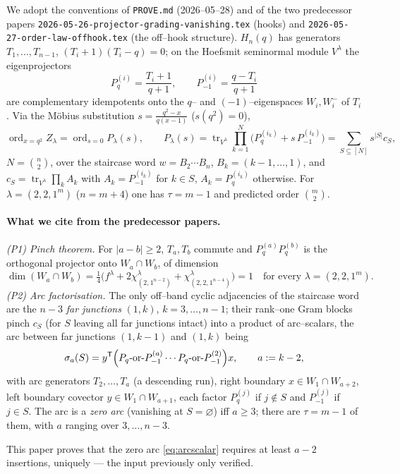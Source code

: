 \documentclass[11pt]{article}
\theoremstyle{definition}
\DeclareMathOperator{\tr}{tr}
\DeclareMathOperator{\ord}{ord}
\newcommand{\Pq}{P_{q}}
\newcommand{\Pm}{P_{-1}}
\newcommand{\la}{\lambda}
\newcommand{\W}{W}
\begin{document}
We adopt the conventions of \texttt{PROVE.md} (2026--05--28) and of the two predecessor
papers \texttt{2026-05-26-projector-grading-vanishing.tex} (hooks) and
\texttt{2026-05-27-order-law-offhook.tex} (the off--hook structure). $H_n(q)$ has
generators $T_1,\dots,T_{n-1}$, $(T_i+1)(T_i-q)=0$; on the Hoefsmit seminormal module
$V^\la$ the eigenprojectors
\[
\Pq^{(i)}=\frac{T_i+1}{q+1},\qquad \Pm^{(i)}=\frac{q-T_i}{q+1}
\]
are complementary idempotents onto the $q$-- and $(-1)$--eigenspaces $\W_i,\W_i^-$ of
$T_i$. Via the M\"obius substitution $s=\tfrac{q^2-x}{q(x-1)}$ ($s(q^2)=0$),
\[
\ord_{x=q^2}Z_\la=\ord_{s=0}P_\la(s),\qquad
P_\la(s)=\tr_{V^\la}\prod_{k=1}^N\bigl(\Pq^{(i_k)}+s\,\Pm^{(i_k)}\bigr)
=\sum_{S\subseteq[N]}s^{|S|}c_S,
\]
$N=\binom n2$, over the staircase word $w=B_2\cdots B_n$, $B_k=(k-1,\dots,1)$, and
$c_S=\tr_{V^\la}\prod_k A_k$ with $A_k=\Pm^{(i_k)}$ for $k\in S$, $A_k=\Pq^{(i_k)}$
otherwise. For $\la=(2,2,1^m)$ ($n=m+4$) one has $\tau=m-1$ and predicted order
$\binom m2$.

\paragraph{What we cite from the predecessor papers.}
\emph{(P1) Pinch theorem.} For $|a-b|\ge2$, $T_a,T_b$ commute and
$\Pq^{(a)}\Pq^{(b)}$ is the orthogonal projector onto $\W_a\cap\W_b$, of dimension
\[
\dim(\W_a\cap\W_b)=\tfrac14\bigl(f^\la+2\chi^\la_{(2,1^{n-2})}+\chi^\la_{(2,2,1^{n-4})}\bigr)=1
\quad\text{for every }\la=(2,2,1^m).
\]
\emph{(P2) Arc factorisation.} The only off--band cyclic adjacencies of the staircase word
are the $n-3$ \emph{far junctions} $(1,k)$, $k=3,\dots,n-1$; their rank--one Gram blocks
pinch $c_S$ (for $S$ leaving all far junctions intact) into a product of arc--scalars,
the arc between far junctions $(1,k{-}1)$ and $(1,k)$ being
\begin{equation}\label{eq:arcscalar}
\sigma_a(S)=y^{\mathsf T}\Bigl(\Pq\text{-or-}\Pm^{(a)}\cdots\Pq\text{-or-}\Pm^{(2)}\Bigr)x,
\qquad a:=k-2,
\end{equation}
with arc generators $T_2,\dots,T_a$ (a descending run), right boundary
$x\in\W_1\cap\W_{a+2}$, left boundary covector $y\in\W_1\cap\W_{a+1}$, each factor
$\Pq^{(j)}$ if $j\notin S$ and $\Pm^{(j)}$ if $j\in S$. The arc is a \emph{zero arc}
(vanishing at $S=\varnothing$) iff $a\ge3$; there are $\tau=m-1$ of them, with $a$ ranging
over $3,\dots,n-3$.

This paper proves that the zero arc \eqref{eq:arcscalar} requires at least $a-2$
insertions, uniquely --- the input previously only verified.
\end{document}
